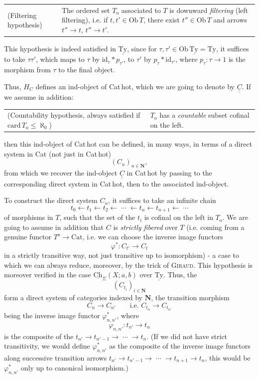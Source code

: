 \documentclass[11pt]{article}
\newcommand{\printedpage}[1]{\marginpar{\footnotesize p.~#1}}
\newcommand{\msp}[1]{\marginpar{\footnotesize [#1]}}
\newcommand{\Cat}{\mathrm{Cat}}
\newcommand{\Ob}{\mathrm{Ob}\,}
\newcommand{\uTy}{\underline{\mathrm{Ty}}}
\newcommand{\uCh}{\underline{\mathrm{Ch}}}
\newcommand{\To}{T_{\mathrm{o}}}
\begin{document}
\noindent\begin{tabular}{@{}p{}p{}@{}}
(Filtering hypothesis) & The ordered set $\To$ associated to $T$ is downward \textit{filtering} (left filtering), i.e. if $t,t' \in \Ob T$, there exist $t'' \in \Ob T$ and arrows $t'' \longrightarrow t$, $t'' \longrightarrow t'$.
\end{tabular}

This hypothesis is indeed satisfied in $\uTy$, since for $\tau,\tau' \in \Ob \uTy = \mathrm{Ty}$, it suffices to take $\tau\tau'$, which maps to $\tau$ by $\mathrm{id}_{\tau} * p_{\tau'}$, to $\tau'$ by $p_{\tau} * \mathrm{id}_{\tau'}$, where $p_{\tau} : \tau \longrightarrow 1$ is the morphism from $\tau$ to the final object.

Thus, $H_{C}$ defines an ind-object of Cat\,hot, which we are going to denote by $\underline{\underline{C}}$. If we assume in addition:

\noindent\begin{tabular}{@{}p{}p{}@{}}
(Countability hypothesis, always satisfied if $\mathrm{card}\,\To \leq \aleph_{0}$) & $\To$ has a \textit{countable} subset cofinal on the left.
\end{tabular}

then this ind-object of Cat\,hot can be defined, in many ways, in terms
\msp{page 101}
of a direct system in Cat (not just in Cat\,hot)
\[
(C_{n})_{n\in\mathbf{N}},
\]
from which we recover the ind-object $\underline{\underline{C}}$ in Cat\,hot by passing to the corresponding direct system in Cat\,hot, then to the associated ind-object.

To construct the direct system $C_{n}$, it suffices to take an infinite chain
\[
t_{0} \longleftarrow t_{1} \longleftarrow t_{2} \longleftarrow \;\cdots\; \longleftarrow t_{n} \longleftarrow t_{n+1} \longleftarrow \;\cdots
\]
of morphisms in $T$, such that the set of the $t_{i}$ is cofinal on the left in $\To$. We are going to assume in addition that $C$ is \textit{strictly fibered} over $T$ (i.e. coming from a genuine functor $T^{o} \longrightarrow \Cat$, i.e. we can choose the inverse image functors
\[
\varphi^{*} : C_{t'} \longrightarrow C_{t}
\]
in a strictly transitive way, not just transitive up to isomorphism) - a case to which we can always reduce, moreover, by the trick of \textsc{Giraud}. This hypothesis is moreover verified in the case $\uCh_{\Sigma}(X;a,b)$ over $\uTy$. Thus, the
\[
(C_{t_{i}})_{i\in\mathbf{N}}
\]
form a direct system of categories indexed by $\mathbf{N}$, the transition morphism
\[
C_{n} \longrightarrow C_{n'} \qquad \text{i.e. } C_{t_{n}} \longrightarrow C_{t_{n'}}
\]
\printedpage{66}
\msp{page 102}
being the inverse image functor $\varphi^{*}_{n,n'}$, where
\[
\varphi_{n,n'} : t_{n'} \longrightarrow t_{n}
\]
is the composite of the $t_{n'} \longrightarrow t_{n'-1} \longrightarrow \;\cdots\; \longrightarrow t_{n}$. (If we did not have strict transitivity, we would define $\varphi^{*}_{n,n'}$ as the composite of the inverse image functors along successive transition arrows $t_{n'} \longrightarrow t_{n'-1} \longrightarrow \;\cdots\; \longrightarrow t_{n+1} \longrightarrow t_{n}$, this would be $\varphi^{*}_{n,n'}$ only up to canonical isomorphism.)
\end{document}
